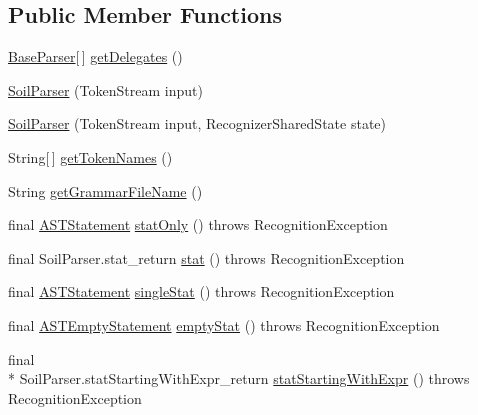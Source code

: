 \subsection*{Public Member Functions}
\begin{DoxyCompactItemize}
\item 
\hyperlink{classorg_1_1tzi_1_1use_1_1parser_1_1base_1_1_base_parser}{Base\-Parser}\mbox{[}$\,$\mbox{]} \hyperlink{classorg_1_1tzi_1_1use_1_1parser_1_1soil_1_1_soil_parser_a1f09143678c9ae8f17fbc9a58b1b4f39}{get\-Delegates} ()
\item 
\hyperlink{classorg_1_1tzi_1_1use_1_1parser_1_1soil_1_1_soil_parser_a6bc198a2afd95d16ca4e7100e6359f2b}{Soil\-Parser} (Token\-Stream input)
\item 
\hyperlink{classorg_1_1tzi_1_1use_1_1parser_1_1soil_1_1_soil_parser_a44af8a1f54816d44b3cdf0016ac87043}{Soil\-Parser} (Token\-Stream input, Recognizer\-Shared\-State state)
\item 
String\mbox{[}$\,$\mbox{]} \hyperlink{classorg_1_1tzi_1_1use_1_1parser_1_1soil_1_1_soil_parser_a8c000cbc0b1b3be98e75b9befaf43207}{get\-Token\-Names} ()
\item 
String \hyperlink{classorg_1_1tzi_1_1use_1_1parser_1_1soil_1_1_soil_parser_a17b0a22620bc6e74c40234bf48921fe8}{get\-Grammar\-File\-Name} ()
\item 
final \hyperlink{classorg_1_1tzi_1_1use_1_1parser_1_1soil_1_1ast_1_1_a_s_t_statement}{A\-S\-T\-Statement} \hyperlink{classorg_1_1tzi_1_1use_1_1parser_1_1soil_1_1_soil_parser_ae9166da2da2a389063458fa5a388e910}{stat\-Only} ()  throws Recognition\-Exception 
\item 
final Soil\-Parser.\-stat\-\_\-return \hyperlink{classorg_1_1tzi_1_1use_1_1parser_1_1soil_1_1_soil_parser_a28628f256af9f568e010c10b56770429}{stat} ()  throws Recognition\-Exception 
\item 
final \hyperlink{classorg_1_1tzi_1_1use_1_1parser_1_1soil_1_1ast_1_1_a_s_t_statement}{A\-S\-T\-Statement} \hyperlink{classorg_1_1tzi_1_1use_1_1parser_1_1soil_1_1_soil_parser_acea51d0980f77f06422687563b52299f}{single\-Stat} ()  throws Recognition\-Exception 
\item 
final \hyperlink{classorg_1_1tzi_1_1use_1_1parser_1_1soil_1_1ast_1_1_a_s_t_empty_statement}{A\-S\-T\-Empty\-Statement} \hyperlink{classorg_1_1tzi_1_1use_1_1parser_1_1soil_1_1_soil_parser_a18ec348fb26e77585c575217c06ef299}{empty\-Stat} ()  throws Recognition\-Exception 
\item 
final \\*
Soil\-Parser.\-stat\-Starting\-With\-Expr\-\_\-return \hyperlink{classorg_1_1tzi_1_1use_1_1parser_1_1soil_1_1_soil_parser_aca91400c6e9c2006b30cad0f152bdfc5}{stat\-Starting\-With\-Expr} ()  throws Recognition\-Exception 

\end{DoxyCompactItemize}
